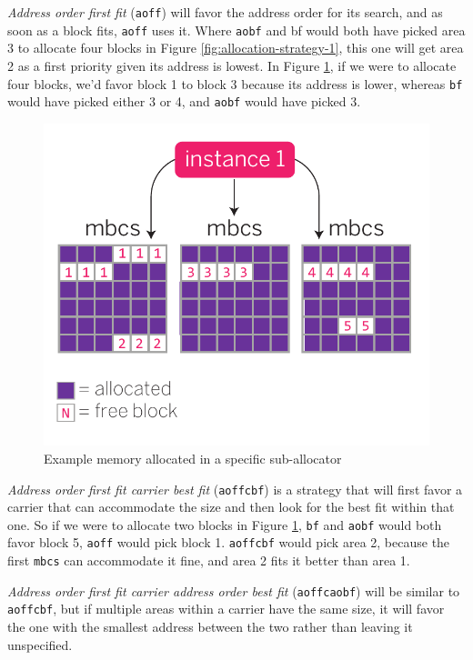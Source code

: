 \documentclass[11pt, oneside]{book}   	%
\newcommand{\term}[1]{\Verb`#1`}
\begin{document}
\emph{Address order first fit} (\term{aoff}) will favor the address order for its search, and as soon as a block fits, \term{aoff} uses it. Where \term{aobf} and bf would both have picked area 3 to allocate four blocks in Figure \ref{fig:allocation-strategy-1}, this one will get area 2 as a first priority given its address is lowest. In Figure \ref{fig:allocation-strategy-2}, if we were to allocate four blocks, we'd favor block 1 to block 3 because its address is lower, whereas \term{bf} would have picked either 3 or 4, and \term{aobf} would have picked 3.

\begin{figure}
  \includegraphics{allocation-strategy-2.pdf}%
  \caption{Example memory allocated in a specific sub-allocator}%
   \label{fig:allocation-strategy-2}
\end{figure}

\emph{Address order first fit carrier best fit} (\term{aoffcbf}) is a strategy that will first favor a carrier that can accommodate the size and then look for the best fit within that one. So if we were to allocate two blocks in Figure \ref{fig:allocation-strategy-2}, \term{bf} and \term{aobf} would both favor block 5, \term{aoff} would pick block 1. \term{aoffcbf} would pick area 2, because the first \term{mbcs} can accommodate it fine, and area 2 fits it better than area 1.

\emph{Address order first fit carrier address order best fit} (\term{aoffcaobf}) will be similar to \term{aoffcbf}, but if multiple areas within a carrier have the same size, it will favor the one with the smallest address between the two rather than leaving it unspecified.
\end{document}
